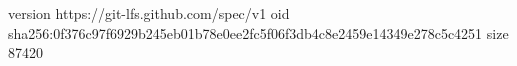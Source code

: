 version https://git-lfs.github.com/spec/v1
oid sha256:0f376c97f6929b245eb01b78e0ee2fc5f06f3db4c8e2459e14349e278c5c4251
size 87420
